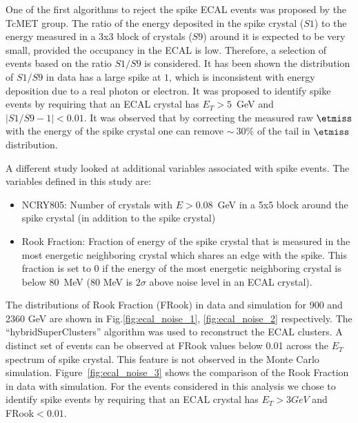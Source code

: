 One of the first algorithms to reject the spike ECAL events was proposed
by the TcMET group. The ratio of the energy deposited in the spike
crystal ($S1$) to the energy measured in a 3x3 block of crystals ($S9$)
around it is expected to be very small, provided the occupancy in the
ECAL is low. Therefore, a selection of events based on the ratio $S1/S9$
is considered. It has been shown the distribution of $S1/S9$ in data has
a large spike at $1$, which is inconsistent with energy deposition due
to a real photon or electron. It was proposed to identify spike events
by requiring that an ECAL crystal has $E_T>5$~GeV and
$|S1/S9-1|<0.01$. It was observed that by correcting the measured raw
$\etmiss$ with the energy of the spike crystal one can remove
$\sim~30\%$ of the tail in $\etmiss$ distribution.

A different study looked at additional variables associated with spike
events. The variables defined in this study are:
\begin{itemize}
\item NCRY805: Number of crystals with $E>0.08$~GeV in a 5x5 block around the
  spike crystal (in addition to the spike crystal)
\item Rook Fraction: Fraction of energy of the spike crystal that is measured in
  the most energetic neighboring crystal which shares an edge with the spike. This
  fraction is set to $0$ if the energy of the most energetic neighboring
  crystal is below $80$~MeV (80 MeV is $2\sigma$ above noise level in an
  ECAL crystal).
\end{itemize}

The distributions of Rook Fraction (FRook) in data and simulation for
900 and 2360 GeV are shown in Fig.\ref{fig:ecal_noise_1},
\ref{fig:ecal_noise_2} respectively. The ``hybridSuperClusters''
algorithm was used to reconstruct the ECAL clusters. A distinct set of events can
be observed at FRook values below 0.01 across the $E_T$ spectrum of
spike crystal. This feature is not observed in the Monte Carlo
simulation. Figure~\ref{fig:ecal_noise_3} shows the comparison of the
Rook Fraction in data with simulation. For the events considered in this
analysis we chose to identify spike events by requiring that an ECAL
crystal has $E_T>3GeV$ and FRook$<0.01$.

